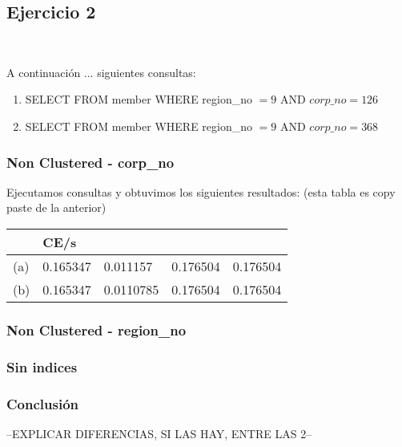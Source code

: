 \subsection{Ejercicio 2}\

A continuación ... siguientes consultas:
\begin{enumerate}[label=(\alph*)]
\item{SELECT \* FROM member WHERE region\_no $= 9$ AND $corp\_no = 126$}

\item{ SELECT \* FROM member WHERE region\_no $= 9$ AND $corp\_no = 368$}

\end{enumerate}





\subsubsection{Non Clustered - corp\_no}

Ejecutamos consultas y obtuvimos los siguientes resultados:
(esta tabla es copy paste de la anterior)
\begin{tabular}{| L | L | L | L | L |}
    \hline
     & CE/s &  &  &  \\ \hline
    (a) & 0.165347 & 0.011157 & 0.176504 & 0.176504 \\ \hline
    (b) & 0.165347 & 0.0110785 & 0.176504 & 0.176504 \\ \hline   
\end{tabular}
	
\subsubsection{Non Clustered - region\_no}
			
\subsubsection{Sin indices}	
			
			


\subsubsection{Conclusión}

--EXPLICAR DIFERENCIAS, SI LAS HAY, ENTRE LAS 2--
